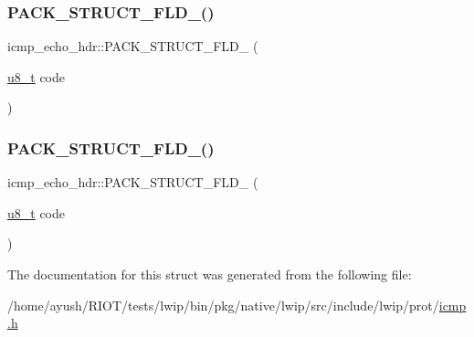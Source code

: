 \subsubsection{\texorpdfstring{P\+A\+C\+K\+\_\+\+S\+T\+R\+U\+C\+T\+\_\+\+F\+L\+D\+\_()}{PACK\_STRUCT\_FLD\_8()}\hspace{0.1cm}{\footnotesize\ttfamily [3/4]}}
{\footnotesize\ttfamily icmp\+\_\+echo\+\_\+hdr\+::\+P\+A\+C\+K\+\_\+\+S\+T\+R\+U\+C\+T\+\_\+\+F\+L\+D\+\_ (\begin{DoxyParamCaption}\item[{\hyperlink{group__compiler__abstraction_ga4caecabca98b43919dd11be1c0d4cd8e}{u8\+\_\+t}}]{code }\end{DoxyParamCaption})}

\mbox{\label{structicmp__echo__hdr_adcbacb52889e263a973944ec5fbd6b55}} 
\subsubsection{\texorpdfstring{P\+A\+C\+K\+\_\+\+S\+T\+R\+U\+C\+T\+\_\+\+F\+L\+D\+\_()}{PACK\_STRUCT\_FLD\_8()}\hspace{0.1cm}{\footnotesize\ttfamily [4/4]}}
{\footnotesize\ttfamily icmp\+\_\+echo\+\_\+hdr\+::\+P\+A\+C\+K\+\_\+\+S\+T\+R\+U\+C\+T\+\_\+\+F\+L\+D\+\_ (\begin{DoxyParamCaption}\item[{\hyperlink{group__compiler__abstraction_ga4caecabca98b43919dd11be1c0d4cd8e}{u8\+\_\+t}}]{code }\end{DoxyParamCaption})}



The documentation for this struct was generated from the following file\+:\begin{DoxyCompactItemize}
\item 
/home/ayush/\+R\+I\+O\+T/tests/lwip/bin/pkg/native/lwip/src/include/lwip/prot/\hyperlink{native_2lwip_2src_2include_2lwip_2prot_2icmp_8h}{icmp.\+h}\end{DoxyCompactItemize}
